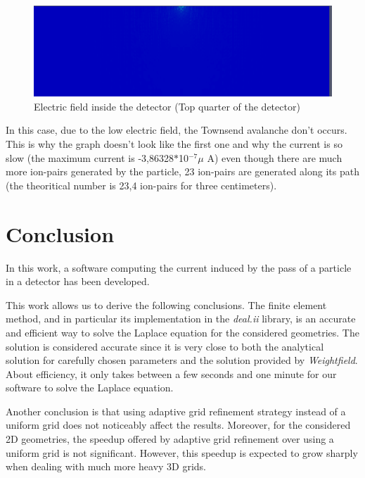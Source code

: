 \documentclass[11pt]{article}
\begin{document}
				\begin{figure}[H]
				  \center
				  \includegraphics[scale=0.4]{images/applications/electric_field.png}
				  \caption{Electric field inside the detector (Top quarter of the detector)}
				  \label{fig:electric_field}
				\end{figure}

				In this case, due to the low electric field, the Townsend avalanche don't occurs. This is why the graph doesn't
				look like the first one and why the current is so slow (the maximum current is -3,86328$*$10$^{-7}\mu$ A) even though
				there are much more ion-pairs generated by the particle, 23 ion-pairs are generated along its path (the theoritical
				number is 23,4 ion-pairs for three centimeters).

\section*{Conclusion}

	In this work, a software computing the current induced by the pass of a
	particle in a detector has been developed.

	This work allows us to derive the following conclusions. The finite element
	method, and in particular its implementation in the \textit{deal.ii} library,
	is an accurate and efficient way to solve the Laplace equation for the
	considered geometries. The solution is considered accurate since it is
	very close to both the analytical solution for carefully chosen parameters and
	the solution provided by \textit{Weightfield}. About efficiency, it only takes between a few seconds
	and one minute for our software to solve the Laplace equation.

  Another conclusion is that using adaptive grid refinement strategy instead
	of a uniform grid does not noticeably affect the results. Moreover, for the
	considered 2D geometries, the speedup offered by adaptive grid refinement over
	using a uniform grid is not significant. However, this speedup is expected
	to grow sharply when dealing with much more heavy 3D grids.
\end{document}
